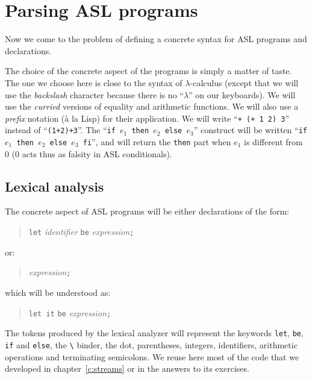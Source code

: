 \section{Parsing ASL programs}

Now we come to the problem of defining a concrete syntax for ASL programs
and declarations.
%

The choice of the concrete aspect of the programs is
simply a matter of taste. The one we choose here is close to the syntax of
$\lambda$-calculus (except that we will use the {\em backslash} character
because there is no ``$\lambda$'' on our keyboards). We will use the {\em
curried} versions of equality and arithmetic functions. We will also use
a {\em prefix} notation (\`a la Lisp) for their application. We will write
``{\tt + (+ 1 2) 3}'' instead of ``{\tt (1+2)+3}''. The ``{\tt if $e_1$
then $e_2$ else $e_3$}'' construct will be written ``{\tt if $e_1$
then $e_2$ else $e_3$ fi}'', and will return the {\tt then} part when
$e_1$ is different from 0 (0 acts thus as falsity in ASL conditionals).

\subsection{Lexical analysis}
\label{s:ASLlexing}

The concrete aspect of ASL programs will be either declarations of the
form:
\begin{quote}
{\tt let} {\it identifier} {\tt be} {\it expression}{\tt ;}
\end{quote}
or:
\begin{quote}
{\it expression}{\tt ;}
\end{quote}
which will be understood as:
\begin{quote}
{\tt let it} {\tt be} {\it expression}{\tt ;}
\end{quote}
The tokens produced by the lexical analyzer will represent the
keywords {\tt let}, {\tt be}, {\tt if} and {\tt else}, the \verb|\|
binder, the dot, parentheses, integers, identifiers, arithmetic
operations and terminating semicolons. We reuse here most of the code
that we developed in chapter~\ref{c:streams} or in the answers to its
exercises.


